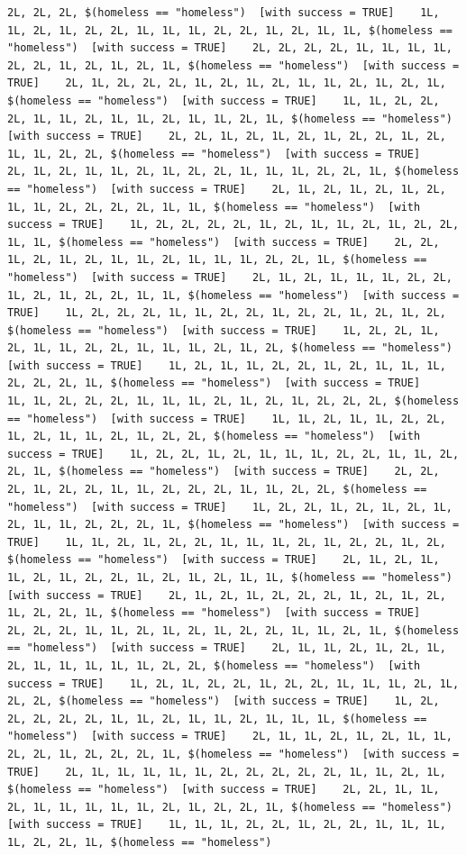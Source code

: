 \documentclass{tufte-book}\usepackage[]{graphicx}\usepackage[]{xcolor}
\makeatletter
\newenvironment{kframe}{%
 \def\at@end@of@kframe{}%
 \ifinner\ifhmode%
  \def\at@end@of@kframe{\end{minipage}}%
  \begin{minipage}{\columnwidth}%
 \fi\fi%
 \def\FrameCommand##1{\hskip\@totalleftmargin \hskip-\fboxsep
 \colorbox{shadecolor}{##1}\hskip-\fboxsep
     \hskip-\linewidth \hskip-\@totalleftmargin \hskip\columnwidth}%
 \MakeFramed {\advance\hsize-\width
   \@totalleftmargin\z@ \linewidth\hsize
   \@setminipage}}%
 {\par\unskip\endMakeFramed%
 \at@end@of@kframe}
\newenvironment{knitrout}{}{} %
\makeatother
\begin{document}
\begin{knitrout}
\begin{kframe}
\begin{verbatim}
2L, 2L, 2L, $(homeless == "homeless")  [with success = TRUE]    1L, 1L, 2L, 1L, 2L, 2L, 1L, 1L, 1L, 2L, 2L, 1L, 2L, 1L, 1L, $(homeless == "homeless")  [with success = TRUE]    2L, 2L, 2L, 2L, 1L, 1L, 1L, 1L, 2L, 2L, 1L, 2L, 1L, 2L, 1L, $(homeless == "homeless")  [with success = TRUE]    2L, 1L, 2L, 2L, 2L, 1L, 2L, 1L, 2L, 1L, 1L, 2L, 1L, 2L, 1L, $(homeless == "homeless")  [with success = TRUE]    1L, 1L, 2L, 2L, 2L, 1L, 1L, 2L, 1L, 1L, 2L, 1L, 1L, 2L, 1L, $(homeless == "homeless")  [with success = TRUE]    2L, 2L, 1L, 2L, 1L, 2L, 1L, 2L, 2L, 1L, 2L, 1L, 1L, 2L, 2L, $(homeless == "homeless")  [with success = TRUE]    2L, 1L, 2L, 1L, 1L, 2L, 1L, 2L, 2L, 1L, 1L, 1L, 2L, 2L, 1L, $(homeless == "homeless")  [with success = TRUE]    2L, 1L, 2L, 1L, 2L, 1L, 2L, 1L, 1L, 2L, 2L, 2L, 2L, 1L, 1L, $(homeless == "homeless")  [with success = TRUE]    1L, 2L, 2L, 2L, 2L, 1L, 2L, 1L, 1L, 2L, 1L, 2L, 2L, 1L, 1L, $(homeless == "homeless")  [with success = TRUE]    2L, 2L, 1L, 2L, 1L, 2L, 1L, 1L, 2L, 1L, 1L, 1L, 2L, 2L, 1L, $(homeless == "homeless")  [with success = TRUE]    2L, 1L, 2L, 1L, 1L, 1L, 2L, 2L, 1L, 2L, 1L, 2L, 2L, 1L, 1L, $(homeless == "homeless")  [with success = TRUE]    1L, 2L, 2L, 2L, 1L, 1L, 2L, 2L, 1L, 2L, 2L, 1L, 2L, 1L, 2L, $(homeless == "homeless")  [with success = TRUE]    1L, 2L, 2L, 1L, 2L, 1L, 1L, 2L, 2L, 1L, 1L, 1L, 2L, 1L, 2L, $(homeless == "homeless")  [with success = TRUE]    1L, 2L, 1L, 1L, 2L, 2L, 1L, 2L, 1L, 1L, 1L, 2L, 2L, 2L, 1L, $(homeless == "homeless")  [with success = TRUE]    1L, 1L, 2L, 2L, 2L, 1L, 1L, 1L, 2L, 1L, 2L, 1L, 2L, 2L, 2L, $(homeless == "homeless")  [with success = TRUE]    1L, 1L, 2L, 1L, 1L, 2L, 2L, 1L, 2L, 1L, 1L, 2L, 1L, 2L, 2L, $(homeless == "homeless")  [with success = TRUE]    1L, 2L, 2L, 1L, 2L, 1L, 1L, 1L, 2L, 2L, 1L, 1L, 2L, 2L, 1L, $(homeless == "homeless")  [with success = TRUE]    2L, 2L, 2L, 1L, 2L, 2L, 1L, 1L, 2L, 2L, 2L, 1L, 1L, 2L, 2L, $(homeless == "homeless")  [with success = TRUE]    1L, 2L, 2L, 1L, 2L, 1L, 2L, 1L, 2L, 1L, 1L, 2L, 2L, 2L, 1L, $(homeless == "homeless")  [with success = TRUE]    1L, 1L, 2L, 1L, 2L, 2L, 1L, 1L, 1L, 2L, 1L, 2L, 2L, 1L, 2L, $(homeless == "homeless")  [with success = TRUE]    2L, 1L, 2L, 1L, 1L, 2L, 1L, 2L, 2L, 1L, 2L, 1L, 2L, 1L, 1L, $(homeless == "homeless")  [with success = TRUE]    2L, 1L, 2L, 1L, 2L, 2L, 2L, 1L, 2L, 1L, 2L, 1L, 2L, 2L, 1L, $(homeless == "homeless")  [with success = TRUE]    2L, 2L, 2L, 1L, 1L, 2L, 1L, 2L, 1L, 2L, 2L, 1L, 1L, 2L, 1L, $(homeless == "homeless")  [with success = TRUE]    2L, 1L, 1L, 2L, 1L, 2L, 1L, 2L, 1L, 1L, 1L, 1L, 1L, 2L, 2L, $(homeless == "homeless")  [with success = TRUE]    1L, 2L, 1L, 2L, 2L, 1L, 2L, 2L, 1L, 1L, 1L, 2L, 1L, 2L, 2L, $(homeless == "homeless")  [with success = TRUE]    1L, 2L, 2L, 2L, 2L, 2L, 1L, 1L, 2L, 1L, 1L, 2L, 1L, 1L, 1L, $(homeless == "homeless")  [with success = TRUE]    2L, 1L, 1L, 2L, 1L, 2L, 1L, 1L, 2L, 2L, 1L, 2L, 2L, 2L, 1L, $(homeless == "homeless")  [with success = TRUE]    2L, 1L, 1L, 1L, 1L, 1L, 2L, 2L, 2L, 2L, 2L, 1L, 1L, 2L, 1L, $(homeless == "homeless")  [with success = TRUE]    2L, 2L, 1L, 1L, 2L, 1L, 1L, 1L, 1L, 1L, 2L, 1L, 2L, 2L, 1L, $(homeless == "homeless")  [with success = TRUE]    1L, 1L, 1L, 2L, 2L, 1L, 2L, 2L, 1L, 1L, 1L, 1L, 2L, 2L, 1L, $(homeless == "homeless")  
\end{verbatim}
\end{kframe}
\end{knitrout}
\end{document}
